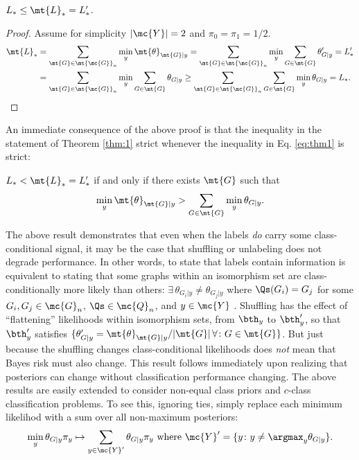 \begin{thm} \label{thm:1}
$L_* \leq \mt{L}_*=L_*'$.
\end{thm}

\begin{proof}
	Assume for simplicity $|\mc{Y}|=2$ and $\pi_0=\pi_1=1/2$.  
\begin{align} \label{eq:thm1}
	\mt{L}_*&=\sum_{\mt{G} \in \mt{\mc{G}}_n} \min_y  \mt{\theta}_{\mt{G}|y}  
	=\sum_{\mt{G} \in \mt{\mc{G}}_n} \min_y  \sum_{G \in \mt{G}}\theta_{G|y}'  = L_*' \nonumber \\
	&=\sum_{\mt{G} \in \mt{\mc{G}}_n} \min_y  \sum_{G \in \mt{G}}\theta_{G|y} 
	 \geq \sum_{\mt{G} \in \mt{\mc{G}}_n} \sum_{G \in \mt{G}} \min_y  \theta_{G|y}  = L_*.
\end{align}
\end{proof}



An immediate consequence of the above proof is that the inequality in the statement of Theorem \ref{thm:1} strict whenever the inequality in Eq. \eqref{eq:thm1} is strict:

\begin{thm} \label{thm:2}
	$L_* < \mt{L}_*=L'_*$ if and only if there exists $\mt{G}$ such that
	$$\min_y \mt{\theta}_{\mt{G}|y} > \sum_{G \in \mt{G}}\min_y \theta_{G|y}.$$
\end{thm}
The above result demonstrates that even when the labels \emph{do} carry some class-conditional signal, it may be the case that shuffling or unlabeling does not degrade performance.  In other words, to state that labels contain information is equivalent to stating that some graphs within an isomorphism set are class-conditionally more likely than others: $\exists \, \theta_{G_i|y} \neq \theta_{G_j|y}$ where $\Qs(G_i)=G_j$ for some $G_i,G_j \in \mc{G}_n$, $\Qs \in \mc{Q}_n$, and $y \in \mc{Y}$%
.  Shuffling has the effect of ``flattening'' likelihoods within isomorphism sets, from $\bth_y$ to $\bth_y'$, so that $\bth_y'$ satisfies $\{\theta_{G|y}'=\mt{\theta}_{\mt{G}|y}/|\mt{G}| \, \forall \colon G \in \mt{G}\}$.  But just because the shuffling changes class-conditional likelihoods does \emph{not} mean that Bayes risk must also change. This result follows immediately upon realizing that posteriors can change without classification performance changing.  The above results are easily extended to consider non-equal class priors and $c$-class classification problems.  To see this, ignoring ties, simply replace each minimum likelihod with a sum over all non-maximum posteriors: 
$$\min_y \theta_{G|y} \pi_y \mapsto \sum_{y \in \mc{Y}'} \theta_{G|y} \pi_y \text{ where } \mc{Y}' =\{y \colon y \neq \argmax_y \theta_{G|y}\}.$$


